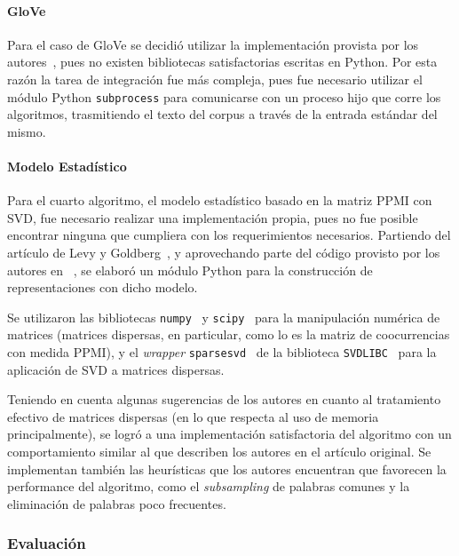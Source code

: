 \paragraph{GloVe}

Para el caso de GloVe se decidió utilizar la implementación provista por los autores~\cite{Pennington2014},
pues no existen bibliotecas satisfactorias escritas en Python. Por esta razón la tarea de integración fue
más compleja, pues fue necesario utilizar el módulo Python \texttt{subprocess} para comunicarse con
un proceso hijo que corre los algoritmos, trasmitiendo el texto del corpus a través de la entrada
estándar del mismo.


\paragraph{Modelo Estadístico}

Para el cuarto algoritmo, el modelo estadístico basado en la matriz PPMI con SVD, fue necesario
realizar una implementación propia, pues no fue posible encontrar ninguna que cumpliera con los
requerimientos necesarios. Partiendo del artículo de Levy y Goldberg~\cite{Levy2015}, y aprovechando
parte del código provisto por los autores en ~\cite{LevyHyperwords}, se elaboró un módulo Python para
la construcción de representaciones con dicho modelo.

Se utilizaron las bibliotecas \texttt{numpy}~\cite{NumPy} y \texttt{scipy}~\cite{SciPy} para la
manipulación numérica de matrices (matrices dispersas, en particular, como lo es la matriz de coocurrencias
con medida PPMI), y el \textit{wrapper} \texttt{sparsesvd}~\cite{sparsesvd} de la biblioteca
\texttt{SVDLIBC}~\cite{SVDLIBC} para la aplicación de SVD a matrices dispersas.

Teniendo en cuenta algunas sugerencias de los autores en cuanto al tratamiento efectivo de matrices
dispersas (en lo que respecta al uso de memoria principalmente), se logró a una implementación
satisfactoria del algoritmo con un comportamiento similar al que describen los autores en el
artículo original. Se implementan también las heurísticas que los autores encuentran que favorecen
la performance del algoritmo, como el \textit{subsampling} de palabras comunes y la eliminación de
palabras poco frecuentes.


\subsubsection{Evaluación}

